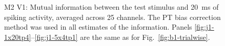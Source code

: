 \begin{figure}[htbp]
\begin{subfigure}[b]{0.5\linewidth}
    \end{subfigure}
    \caption{\ac{M2} \ac{V1}: Mutual information between the test stimulus and \SI{20}{ms} of spiking activity, averaged across 25 channels.
The \ac{PT} bias correction method was used in all estimates of the information.
Panels \ref{fig:j1-1x20tp4}--\ref{fig:j1-5x4tp1} are the same as for Fig.~\ref{fig:b1-trialwise}.
}
    \label{fig:j1-trialwise}
\end{figure}



